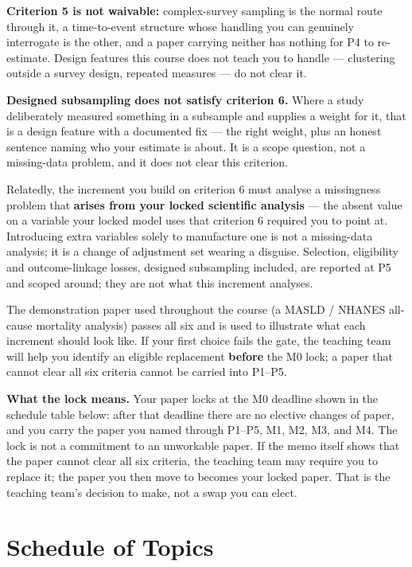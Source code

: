 \documentclass[
]{article}
\begin{document}
\textbf{Criterion 5 is not waivable:} complex-survey sampling is the
normal route through it, a time-to-event structure whose handling you
can genuinely interrogate is the other, and a paper carrying neither has
nothing for P4 to re-estimate. Design features this course does not
teach you to handle --- clustering outside a survey design, repeated
measures --- do not clear it.

\textbf{Designed subsampling does not satisfy criterion 6.} Where a
study deliberately measured something in a subsample and supplies a
weight for it, that is a design feature with a documented fix --- the
right weight, plus an honest sentence naming who your estimate is about.
It is a scope question, not a missing-data problem, and it does not
clear this criterion.

Relatedly, the increment you build on criterion 6 must analyse a
missingness problem that \textbf{arises from your locked scientific
analysis} --- the absent value on a variable your locked model uses that
criterion 6 required you to point at. Introducing extra variables solely
to manufacture one is not a missing-data analysis; it is a change of
adjustment set wearing a disguise. Selection, eligibility and
outcome-linkage losses, designed subsampling included, are reported at
P5 and scoped around; they are not what this increment analyses.

The demonstration paper used throughout the course (a MASLD / NHANES
all-cause mortality analysis) passes all six and is used to illustrate
what each increment should look like. If your first choice fails the
gate, the teaching team will help you identify an eligible replacement
\textbf{before} the M0 lock; a paper that cannot clear all six criteria
cannot be carried into P1--P5.

\textbf{What the lock means.} Your paper locks at the M0 deadline shown
in the schedule table below: after that deadline there are no elective
changes of paper, and you carry the paper you named through P1--P5, M1,
M2, M3, and M4. The lock is not a commitment to an unworkable paper. If
the memo itself shows that the paper cannot clear all six criteria, the
teaching team may require you to replace it; the paper you then move to
becomes your locked paper. That is the teaching team's decision to make,
not a swap you can elect.

\section{Schedule of Topics}\label{schedule-of-topics}
\end{document}
